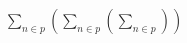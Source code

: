 \documentclass[preview]{standalone}
\begin{document}
\begin{align*}
\sum_{n\in p}\left ( \sum_{n\in p} \left ( \sum_{n\in p}  \right ) \right )
\end{align*}
\end{document}
